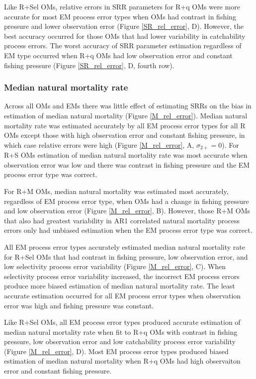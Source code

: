\documentclass[
  12pt,
]{article}
\begin{document}
Like R+Sel OMs, relative errors in SRR parameters for R+q OMs were more
accurate for most EM process error types when OMs had contrast in
fishing pressure and lower observation error (Figure \ref{SR_rel_error},
D). However, the best accuracy occurred for those OMs that had lower
variability in catchability process errors. The worst accuracy of SRR
parameter estimation regardless of EM type occurred when R+q OMs had low
observation error and constant fishing pressure (Figure
\ref{SR_rel_error}, D, fourth row).

\hypertarget{median-natural-mortality-rate}{%
\subsubsection*{Median natural mortality
rate}\label{median-natural-mortality-rate}}

Across all OMs and EMs there was little effect of estimating SRRs on the
bias in estimation of median natural mortality (Figure
\ref{M_rel_error}). Median natural mortality rate was estimated
accurately by all EM process error types for all R OMs except those with
high observation error and constant fishing pressure, in which case
relative errors were high (Figure \ref{M_rel_error}, A,
\(\sigma_{2+} = 0\)). For R+S OMs estimation of median natural mortality
rate was most accurate when observation error was low and there was
contrast in fishing pressure and the EM process error type was correct.

For R+M OMs, median natural mortality was estimated most accurately,
regardless of EM process error type, when OMs had a change in fishing
pressure and low observation error (Figure \ref{M_rel_error}, B).
However, those R+M OMs that also had greatest variability in AR1
correlated natural mortality process errors only had unbiased estimation
when the EM process error type was correct.

All EM process error types accurately estimated median natural mortality
rate for R+Sel OMs that had contrast in fishing pressure, low
observation error, and low selectivity process error variability (Figure
\ref{M_rel_error}, C). When selectivity process error variability
increased, the incorrect EM process errors produce more biased
estimation of median natural mortality rate. The least accurate
estimation occurred for all EM process error types when observation
error was high and fishing pressure was constant.

Like R+Sel OMs, all EM process error types produced accurate estimation
of median natural mortality rate when fit to R+q OMs with contrast in
fishing pressure, low observation error and low catchability process
error variability (Figure \ref{M_rel_error}, D). Most EM process error
types produced biased estimation of median natural mortality when R+q
OMs had high observaiton error and constant fishing pressure.
\end{document}
